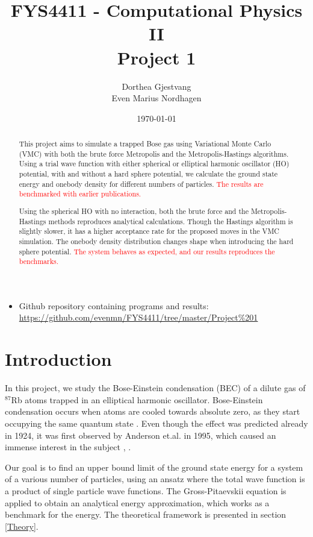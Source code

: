 \documentclass[norsk,a4paper,12pt]{article}
\title{FYS4411 - Computational Physics II\\\vspace{2mm} \Large{Project 1}}
\author{\large Dorthea Gjestvang\\ Even Marius Nordhagen}
\date\today
\begin{document}
\maketitle

\begin{itemize}
\item Github repository containing programs and results: \\\url{https://github.com/evenmn/FYS4411/tree/master/Project%201}
\end{itemize}

\begin{abstract}
This project aims to simulate a trapped Bose gas using Variational Monte Carlo (VMC) with both the  brute force Metropolis and the Metropolis-Hastings algorithms. Using a trial wave function with either spherical or elliptical harmonic oscillator (HO) potential, with and without a hard sphere potential, we calculate the ground state energy and onebody density for different numbers of particles. \textcolor{red}{The results are benchmarked with earlier publications.} \par 

Using the spherical HO with no interaction, both the brute force and the Metropolis-Hastings methods reproduces analytical calculations. Though the Hastings algorithm is slightly slower, it has a higher acceptance rate for the proposed moves in the VMC simulation. The onebody density distribution changes shape when introducing the hard sphere potential. \textcolor{red}{The system behaves as expected, and our results reproduces the benchmarks.}
\par 

\end{abstract}

\newpage

\section{Introduction}

In this project, we study the Bose-Einstein condensation (BEC) of a dilute gas of $^{87}$Rb atoms trapped in an elliptical harmonic oscillator. Bose-Einstein condensation occurs when atoms are cooled towards absolute zero, as they start occupying the same quantum state \cite{JE2016}. Even though the effect was predicted already in 1924, it was first observed by Anderson et.al. in 1995, which caused an immense interest in the subject \cite{SP}, \cite{Anderson}.

Our goal is to find an upper bound limit of the ground state energy for a system of a various number of particles, using an ansatz where the total wave function is a product of single particle wave functions. The Gross-Pitaevskii equation is applied to obtain an analytical energy approximation, which works as a benchmark for the energy. The theoretical framework is presented in section \ref{Theory}. \par
\end{document}
